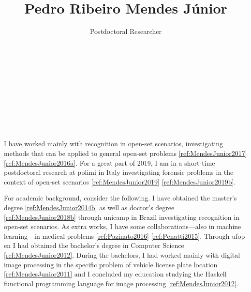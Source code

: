 

\title{Pedro Ribeiro Mendes Júnior}

\author{Postdoctoral Researcher\\%
  \\%
  \\%
  \\%
  \\%
  \\%
  \\%
  \\%
  \\%
}
\date{}



\maketitle

I have worked mainly with recognition in open-set scenarios, investigating methods that can be applied to general open-set problems \ref{ref:MendesJunior2017} \ref{ref:MendesJunior2016a}.
For a great part of 2019, I am in a short-time postdoctoral research at \gls{polimi} in Italy investigating forensic problems in the context of open-set scenarios \ref{ref:MendesJunior2019} \ref{ref:MendesJunior2019b}.

For academic background, consider the following.
I have obtained the master's degree \ref{ref:MendesJunior2014b} as well as doctor's degree \ref{ref:MendesJunior2018b} through \gls{unicamp} in Brazil investigating recognition in open-set scenarios.
As extra works, I have some collaborations---also in machine learning---in medical problems \ref{ref:Pazinato2016} \ref{ref:Penatti2015}.
Through \gls{ufop-en} I had obtained the bachelor's degree in Computer Science \ref{ref:MendesJunior2012}.
During the bachelors, I had worked mainly with digital image processing in the specific problem of vehicle license plate location \ref{ref:MendesJunior2011} and I concluded my education studying the Haskell functional programming language for image processing \ref{ref:MendesJunior2012}.

